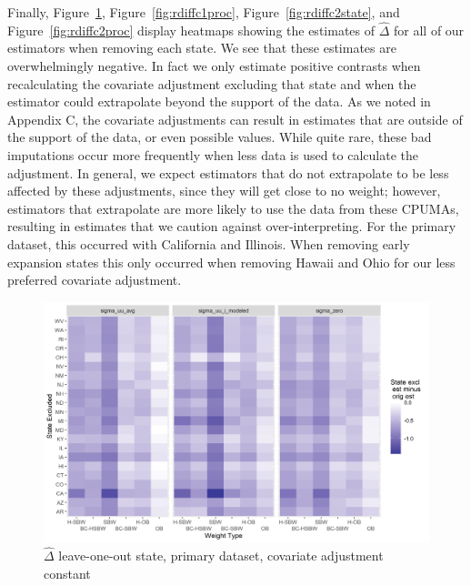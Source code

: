 \documentclass[12pt]{article}
\begin{document}
Finally, Figure~\ref{fig:rdiffc1state}, Figure~\ref{fig:rdiffc1proc}, Figure~\ref{fig:rdiffc2state}, and Figure~\ref{fig:rdiffc2proc} display heatmaps showing the estimates of $\hat{\Delta}$ for all of our estimators when removing each state. We see that these estimates are overwhelmingly negative. In fact we only estimate positive contrasts when recalculating the covariate adjustment excluding that state and when the estimator could extrapolate beyond the support of the data. As we noted in Appendix C, the covariate adjustments can result in estimates that are outside of the support of the data, or even possible values. While quite rare, these bad imputations occur more frequently when less data is used to calculate the adjustment. In general, we expect estimators that do not extrapolate to be less affected by these adjustments, since they will get close to no weight; however, estimators that extrapolate are more likely to use the data from these CPUMAs, resulting in estimates that we caution against over-interpreting. For the primary dataset, this occurred with California and Illinois. When removing early expansion states this only occurred when removing Hawaii and Ohio for our less preferred covariate adjustment.

\begin{figure}[]
\begin{center}
    \includegraphics[scale=0.6]{01_Plots/loostate-repub-sensitivityc1-state-full.png}
    \caption{$\hat{\Delta}$ leave-one-out state, primary dataset, covariate adjustment constant}
    \label{fig:rdiffc1state}
\end{center}
\end{figure}
\end{document}
